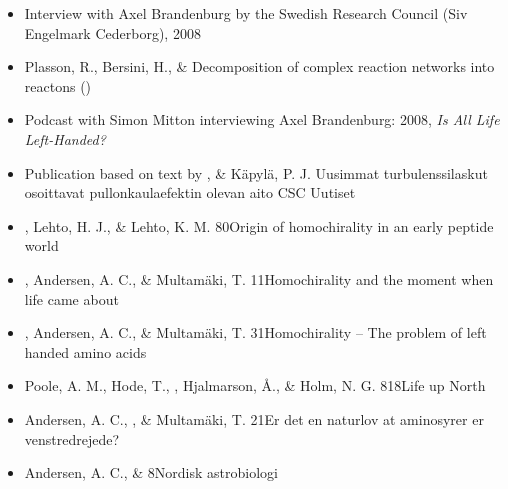 \begin{itemize}
\item[25.]
Interview with Axel Brandenburg by the Swedish Research Council
(Siv Engelmark Cederborg), 2008

\item[24.]
Plasson, R., Bersini, H., \& \Brandenburg{}
{Decomposition of complex reaction networks into reactons}
()

\item[23.]
Podcast with Simon Mitton interviewing Axel Brandenburg: 2008,
{\it Is All Life Left-Handed?}

\item[22.]
Publication based on text by \Brandenburg, \& K\"apyl\"a, P. J.
{Uusimmat turbulenssilaskut osoittavat pullonkaulaefektin olevan aito}
{CSC Uutiset}

\item[21.]
\Brandenburg, Lehto, H. J., \& Lehto, K. M.
{80}{Origin of homochirality in an early peptide world}

\item[20.]
\Brandenburg, Andersen, A. C., \& Multam\"aki, T.
{11}{Homochirality and the moment when life came about}

\item[19.]
\Brandenburg, Andersen, A. C., \& Multam\"aki, T.
{31}{Homochirality -- The problem of left handed amino acids}

\item[18.]
Poole, A. M., Hode, T., \Brandenburg, Hjalmarson, \AA.,
\& Holm, N. G.
{818}{Life up North}

\item[17.]
Andersen, A. C., \Brandenburg,
\& Multam\"aki, T.
{21}{Er det en naturlov at aminosyrer er venstredrejede?}

\item[16.]
Andersen, A. C., \& \Brandenburg{}
{8}{Nordisk astrobiologi}


\end{itemize}
